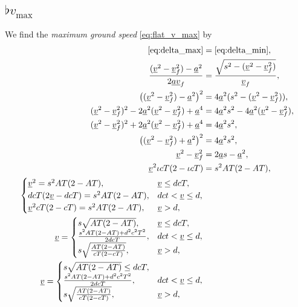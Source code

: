 \subsection{$\flat{v}_{\max}$}
\label{app:derive_flat_v_max}
We find the \emph{maximum ground speed} \eqref{eq:flat_v_max} by
\begin{align}
\nonumber
\eqref{eq:delta_max} &= \eqref{eq:delta_min},\\
\nonumber
\frac{(\flat{v}^2 - \flat{v}_f^2) - \flat{a}^2}{2 \flat{a}\flat{v}_f} &= \frac{\sqrt{s^2 - (\flat{v}^2 - \flat{v}_f^2)}}{\flat{v}_f},\\
\nonumber
\left((\flat{v}^2 - \flat{v}_f^2) - \flat{a}^2\right)^2 &= 4 \flat{a}^2(s^2 - (\flat{v}^2 - \flat{v}_f^2)),\\
\nonumber
(\flat{v}^2 - \flat{v}_f^2)^2 - 2 \flat{a}^2(\flat{v}^2 - \flat{v}_f^2) + \flat{a}^4 &= 4 \flat{a}^2s^2 - 4 \flat{a}^2 (\flat{v}^2 - \flat{v}_f^2),\\
\nonumber
(\flat{v}^2 - \flat{v}_f^2)^2 + 2 \flat{a}^2(\flat{v}^2 - \flat{v}_f^2) + \flat{a}^4 &= 4 \flat{a}^2 s^2,\\
\nonumber
\left((\flat{v}^2 - \flat{v}_f^2) + \flat{a}^2\right)^2 &= 4 \flat{a}^2s^2,\\
\label{eq:maxgs}
\flat{v}^2 - \flat{v}_f^2 &= 2 \flat{a} s - \flat{a}^2,\\
\flat{v}^2 \iota cT (2 - \iota cT) &= s^2 AT(2 - AT),\\
\begin{cases}
\flat{v}^2 = s^2 AT(2 - AT), &\flat{v} \le d cT,\\
d cT (2 \flat{v} - d cT) = s^2 AT(2 - AT), &d ct < \flat{v} \le d,\\
\flat{v}^2 cT (2 - cT) = s^2 AT(2 - AT), &\flat{v} > d,\\
\end{cases}\\
\flat{v} =
\begin{cases}
s \sqrt{AT(2 - AT)}, &\flat{v} \le d cT,\\
\frac{s^2 AT(2 - AT) + d^2 c^2 T^2}{2 d cT}, &d ct < \flat{v} \le d,\\
s \sqrt{\frac{AT(2 - AT)}{cT (2 - cT)}}, &\flat{v} > d,\\
\end{cases}\\
\flat{v} =
\begin{cases}
s \sqrt{AT(2 - AT)} \le d cT,\\
\frac{s^2 AT(2 - AT) + d^2 c^2 T^2}{2 d cT}, &d ct < \flat{v} \le d,\\
s \sqrt{\frac{AT(2 - AT)}{cT (2 - cT)}}, &\flat{v} > d,\\
\end{cases}\\
\end{align}
